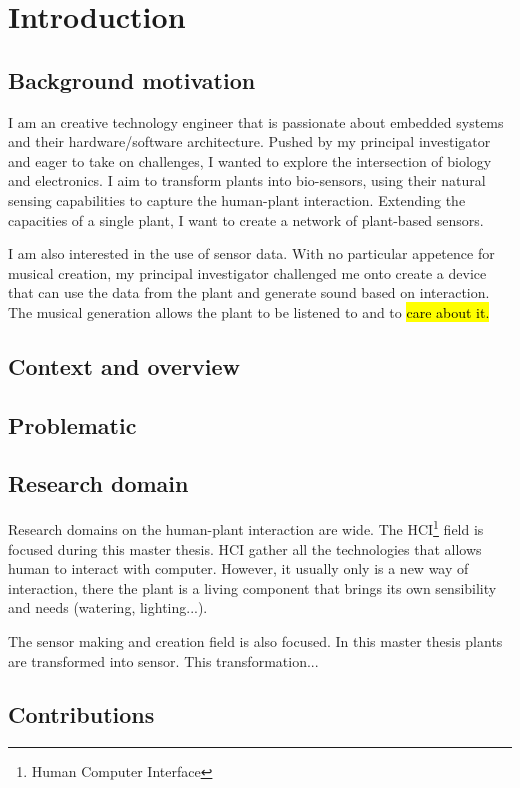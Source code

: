 \section{Introduction}

\subsection{Background motivation}

I am an creative technology engineer that is passionate about embedded systems and 
their hardware/software architecture.
Pushed by my principal investigator and eager to take on challenges, I wanted to 
explore the intersection of biology and electronics. 
I aim to transform plants into bio-sensors, using their natural sensing capabilities to 
capture the human-plant interaction. Extending the capacities of a single plant, I want to create a network of 
plant-based sensors. 

I am also interested in the use of sensor data. With no particular appetence for musical creation, 
my principal investigator challenged me onto create a device that can use the data from the plant 
and generate sound based on interaction. The musical generation allows the plant to be listened to and to \hl{care
about it.}

\subsection{Context and overview}

\subsection{Problematic}

\subsection{Research domain}

Research domains on the human-plant interaction are wide. The HCI\footnote{Human Computer Interface} field is focused
during this master thesis. HCI gather all the technologies that allows human to interact with computer.
However, it usually only is a new way of interaction, there the plant is a living component that brings its 
own sensibility and needs (watering, lighting...).

The sensor making and creation field is also focused. In this master thesis plants are transformed into sensor.
This transformation...


\subsection{Contributions}